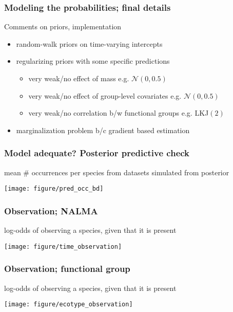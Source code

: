 \documentclass{beamer}
\begin{document}
\begin{frame}
  \frametitle{Modeling the probabilities; final details}

  \begin{block}{Comments on priors, implementation}
    \setlength\abovedisplayskip{-0.1cm}
    \begin{itemize}
      \item random-walk priors on time-varying intercepts
      \item regularizing priors with some specific predictions
        \begin{itemize}
          \item very weak/no effect of mass e.g. \(\mathcal{N}(0, 0.5)\)
          \item very weak/no effect of group-level covariates e.g. \(\mathcal{N}(0, 0.5)\)
          \item very weak/no correlation b/w functional groups e.g. LKJ\((2)\)
        \end{itemize}
      \item marginalization problem b/c gradient based estimation
    \end{itemize}
  \end{block}
\end{frame}


\begin{frame}
  \frametitle{Model adequate? Posterior predictive check}
  \begin{center}
    mean \# occurrences per species from datasets simulated from posterior

    \texttt{[image: figure/pred\_occ\_bd]}
  \end{center}
\end{frame}

\begin{frame}
  \frametitle{Observation; NALMA}
  \begin{center}
    log-odds of observing a species, given that it is present

    \texttt{[image: figure/time\_observation]}
  \end{center}
\end{frame}

\begin{frame}
  \frametitle{Observation; functional group}
  \begin{center}
    log-odds of observing a species, given that it is present

    \texttt{[image: figure/ecotype\_observation]}
  \end{center}
\end{frame}
\end{document}
